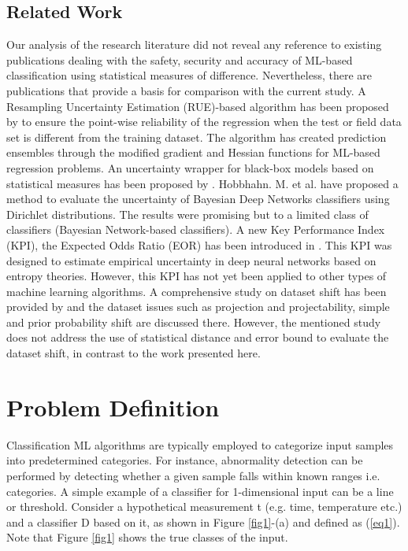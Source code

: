 \documentclass{article}
\begin{document}
\subsection{Related Work} \label{related-work}
Our analysis of the research literature did not reveal any reference to existing publications dealing with the safety, security and accuracy of ML-based classification using statistical measures of difference. Nevertheless, there are publications that provide a basis for comparison with the current study.
A Resampling Uncertainty Estimation (RUE)-based algorithm has been proposed by \cite{schulam2019can} to ensure the point-wise reliability of the regression when the test or field data set is different from the training dataset. The algorithm has created prediction ensembles through the modified gradient and Hessian functions for ML-based regression problems. An uncertainty wrapper for black-box models based on statistical measures has been proposed by \cite{klas2019uncertainty}. Hobbhahn. M. et al. \cite{hobbhahn2020fast} have proposed a method to evaluate the uncertainty of Bayesian Deep Networks classifiers using Dirichlet distributions. The results were promising but to a limited class of classifiers (Bayesian Network-based classifiers). A new Key Performance Index (KPI), the Expected Odds Ratio (EOR) has been introduced in \cite{finlay2019empirical}. This KPI was designed to estimate empirical uncertainty in deep neural networks based on entropy theories. However, this KPI has not yet been applied to other types of machine learning algorithms. A comprehensive study on dataset shift has been provided by \cite{quionero2009dataset} and the dataset issues such as projection and projectability, simple and prior probability shift are discussed there. However, the mentioned study does not address the use of statistical distance and error bound to evaluate the dataset shift, in contrast to the work presented here.

\section{Problem Definition} \label{section-problem-definition}
Classification ML algorithms are typically employed to categorize input samples into predetermined categories. For instance, abnormality detection can be performed by detecting whether a given sample falls within known ranges i.e. categories. A simple example of a classifier for 1-dimensional input can be a line or threshold. Consider a hypothetical measurement t (e.g. time, temperature etc.) and a classifier D based on it, as shown in Figure \ref{fig1}-(a) and defined as (\ref{eq1}). Note that Figure \ref{fig1} shows the true classes of the input.
\end{document}
